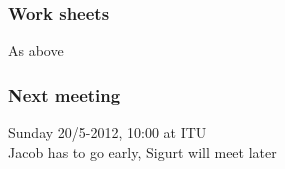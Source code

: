 \subsubsection*{Work sheets}
As above

\subsubsection*{Next meeting}
Sunday 20/5-2012, 10:00 at ITU \\
Jacob has to go early, Sigurt will meet later